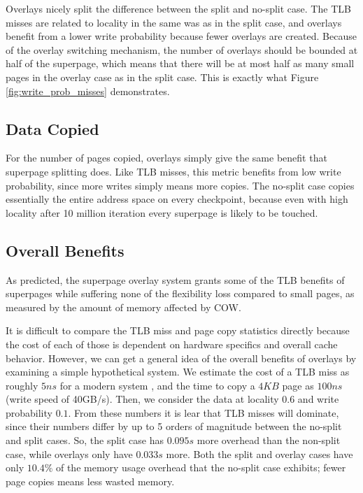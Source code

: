 Overlays nicely split the difference between the split and no-split case. The TLB misses are related to locality in the same was as in the split case, and overlays benefit from a lower write probability because fewer overlays are created. Because of the overlay switching mechanism, the number of overlays should be bounded at half of the superpage, which means that there will be at most half as many small pages in the overlay case as in the split case. This is exactly what Figure \ref{fig:write_prob_misses} demonstrates.

\subsection{Data Copied}
For the number of pages copied, overlays simply give the same benefit that superpage splitting does. Like TLB misses, this metric benefits from low write probability, since more writes simply means more copies. The no-split case copies essentially the entire address space on every checkpoint, because even with high locality after 10 million iteration every superpage is likely to be touched.

\subsection{Overall Benefits}
As predicted, the superpage overlay system grants some of the TLB benefits of superpages while suffering none of the flexibility loss compared to small pages, as measured by the amount of memory affected by COW.

It is difficult to compare the TLB miss and page copy statistics directly because the cost of each of those is dependent on hardware specifics and overall cache behavior. However, we can get a general idea of the overall benefits of overlays by examining a simple hypothetical system. We estimate the cost of a TLB miss as roughly $5ns$ for a modern system \cite{Gorman}, and the time to copy a $4KB$ page as $100ns$ (write speed of 40GB/s). Then, we consider the data at locality $0.6$ and write probability $0.1$. From these numbers it is lear that TLB misses will dominate, since their numbers differ by up to 5 orders of magnitude between the no-split and split cases. So, the split case has $0.095s$ more overhead than the non-split case, while overlays only have $0.033s$ more. Both the split and overlay cases have only $10.4\%$ of the memory usage overhead that the no-split case exhibits; fewer page copies means less wasted memory.

